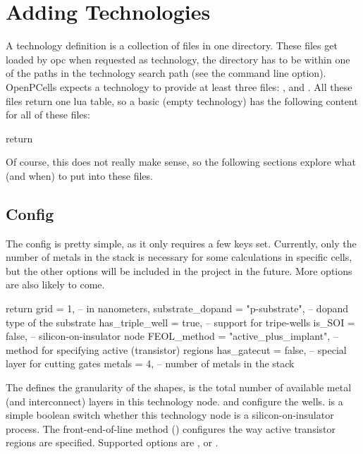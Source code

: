 \section{Adding Technologies}
A technology definition is a collection of files in one directory.
These files get loaded by opc when requested as technology, the directory has to be within one of the paths in the technology search path (see the  command line option).
OpenPCells expects a technology to provide at least three files: ,  and .
All these files return one lua table, so a basic (empty technology) has the following content for all of these files:
\begin{lualisting}
    return {}
\end{lualisting}
Of course, this does not really make sense, so the following sections explore what (and when) to put into these files.

\subsection{Config}
The config is pretty simple, as it only requires a few keys set.
Currently, only the number of metals in the stack is necessary for some calculations in specific cells, but the other options will be included in the project in the future.
More options are also likely to come.

\begin{lualisting}
    return {
        grid = 1, -- in nanometers,
        substrate_dopand = "p-substrate", -- dopand type of the substrate
        has_triple_well = true, -- support for tripe-wells
        is_SOI = false, -- silicon-on-insulator node
        FEOL_method = "active_plus_implant", -- method for specifying active (transistor) regions
        has_gatecut = false, -- special layer for cutting gates
        metals = 4, -- number of metals in the stack
    }
\end{lualisting}

The  defines the granularity of the shapes,  is the total number of available metal (and interconnect) layers in this technology node.
 and  configure the wells.
 is a simple boolean switch whether this technology node is a silicon-on-insulator process.
The front-end-of-line method () configures the way active transistor regions are specified.
Supported options are ,  or .

